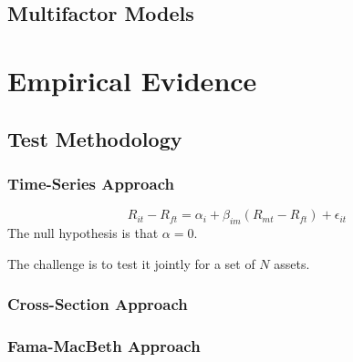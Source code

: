 \documentclass[11pt,green,twocol,citestyle=authoryear, bibstyle=authoryear]{elegantbook}
\begin{document}
\subsection{Multifactor Models}

\section{Empirical Evidence}

\subsection{Test Methodology}

\subsubsection{Time-Series Approach}
\begin{equation}\label{equ:capm-ts}
    R_{i t}-R_{f t}=\alpha_i+\beta_{i m} (R_{m t}-R_{f t})+\epsilon_{i t}
\end{equation}
The null hypothesis is that $ \alpha = 0 $. 
\begin{note}
    The challenge is to test it jointly for a set of $ N $ assets.
\end{note}

\subsubsection{Cross-Section Approach}

\subsubsection{Fama-MacBeth Approach}
\end{document}
